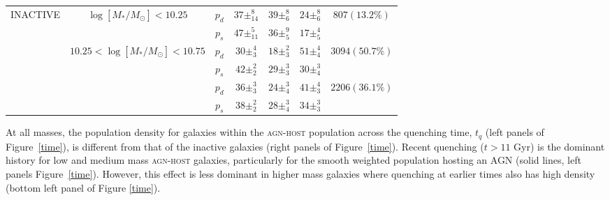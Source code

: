 \begin{table}
{{\begin{tabular}{c|c|c|c|c|c|c}
\multirow{6}{*}{INACTIVE}  & \multirow{2}{*}{$\log [M_*/M_{\odot}] < 10.25 $}                       & $p_d$     & $37\pm_{14}^{8}$                    & $39\pm_{6}^{8}$                    & $24\pm_{6}^{8}$        & \multirow{2}{*}{$807 (13.2\%)$}                      \\
                           &                                                 & $p_s$     & $47\pm_{11}^{5}$                    & $36\pm_{5}^{9}$                    & $17\pm_{5}^{4}$        &                                                      \\ \cline{2-7} 
                           & \multirow{2}{*}{$10.25 < \log [M_*/M_{\odot}] < 10.75$}                    & $p_d$     &          $30\pm_{3}^{4}$                          &       $18\pm_{3}^{2}$                            &    $51\pm_{4}^{4}$                   & \multirow{2}{*}{$3094 (50.7\%)$}                     \\
                           &                                                 & $p_s$     & $42\pm_{2}^{2}$            & $29\pm_{3}^{3}$   & $30\pm_{4}^{3}$ &                                                      \\ \cline{2-7} 
                           & {\multirow{2}{*}{$\log [M_*/M_{\odot}] > 10.75$}} & $p_d$     & $36\pm_{3}^{3}$            & $24\pm_{4}^{3}$         & $41\pm_{3}^{4}$ & \multicolumn{1}{l}{\multirow{2}{*}{$2206 (36.1\%)$}} \\
                           & \multicolumn{1}{l|}{}                           & $p_s$      & $38\pm_{2}^{2}$              & $28\pm_{4}^{3}$            & $34\pm_{3}^{3}$ & \multicolumn{1}{l}{}                                 \\ \hline                       
\end{tabular}}}
\end{table}

At all masses, the population density for galaxies within the \textsc{agn-host} population across the quenching time, $t_q$ (left panels of Figure~\ref{time}), is different from that of the inactive galaxies (right panels of Figure~\ref{time}). Recent quenching ($t > 11$ Gyr) is the dominant history for low and medium mass \textsc{agn-host} galaxies, particularly for the smooth weighted population hosting an AGN (solid lines, left panels Figure~\ref{time}). However, this effect is less dominant in higher mass galaxies where quenching at earlier times also has high density (bottom left panel of Figure \ref{time}).



